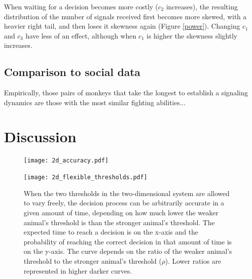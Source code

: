 \documentclass{article}
\begin{document}
When waiting for a decision becomes more costly ($c_2$ increases), the resulting distribution of the number of signals received first becomes more skewed, with a heavier right tail, and then loses it skewness again (Figure \ref{power}). Changing $c_1$ and $c_3$ have less of an effect, although when $c_1$ is higher the skewness slightly increases.

\subsection{Comparison to social data }
Empirically, those pairs of monkeys that take the longest to establish a signaling dynamics are those with the most similar fighting abilities...

\section{Discussion}

\begin{figure}
\texttt{[image: 2d\_accuracy.pdf]}
\caption{\label{2dacc} }
\end{figure}

\begin{figure}
\texttt{[image: 2d\_flexible\_thresholds.pdf]}
\caption{\label{2dflex} When the two thresholds in the two-dimensional system are allowed to vary freely, the decision process can be arbitrarily accurate in a given amount of time, depending on how much lower the weaker animal's threshold is than the stronger animal's threshold.  The expected time to reach a decision is on the x-axis and the probability of reaching the correct decision in that amount of time is on the y-axis.  The curve depends on the ratio of the weaker animal's threshold to the stronger animal's threshold ($\rho$).  Lower ratios are represented in higher darker curves.}
\end{figure}
\end{document}
